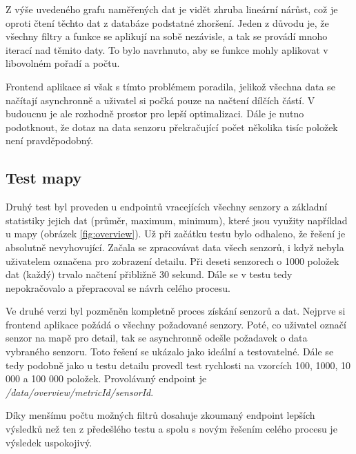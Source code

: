 \documentclass[thesis=M,czech]{FITthesis}[2018/10/20]
\begin{document}
Z výše uvedeného grafu naměřených dat je vidět zhruba lineární nárůst, což je oproti čtení těchto dat z databáze podstatné zhoršení. Jeden z důvodu je, že všechny filtry a funkce se aplikují na sobě nezávisle, a tak se provádí mnoho iterací nad těmito daty. To bylo navrhnuto, aby se funkce mohly aplikovat v libovolném pořadí a počtu. 

Frontend aplikace si však s tímto problémem poradila, jelikož všechna data se načítají asynchronně a uživatel si počká pouze na načtení dílčích částí. V budoucnu je ale rozhodně prostor pro lepší optimalizaci. Dále je nutno podotknout, že dotaz na data senzoru překračující počet několika tisíc položek není pravděpodobný.
\newpage
\subsection{Test mapy}
Druhý test byl proveden u endpointů vracejících všechny senzory a základní statistiky jejich dat (průměr, maximum, minimum), které jsou využity například u mapy (obrázek \ref{fig:overview}). Už při začátku testu bylo odhaleno, že řešení je absolutně nevyhovující. Začala se zpracovávat data všech senzorů, i když nebyla uživatelem označena pro zobrazení detailu. Při deseti senzorech o 1000 položek dat (každý) trvalo načtení přibližně 30 sekund. Dále se v testu tedy nepokračovalo a přepracoval se návrh celého procesu. 


Ve druhé verzi byl pozměněn kompletně proces získání senzorů a dat. Nejprve si frontend aplikace požádá o všechny požadované senzory. Poté, co uživatel označí senzor na mapě pro detail, tak se asynchronně odešle požadavek o data vybraného senzoru. Toto řešení se ukázalo jako ideální a testovatelné. Dále se tedy podobně jako u testu detailu provedl test rychlosti na vzorcích 100, 1000, 10 000 a 100 000 položek. Provolávaný endpoint je \textit{/data/overview/metricId/sensorId}.

\begin{figure}[h]
\end{figure}

Díky menšímu počtu možných filtrů dosahuje zkoumaný endpoint lepších výsledků než ten z předešlého testu a spolu s novým řešením celého procesu je výsledek uspokojivý.
\end{document}
